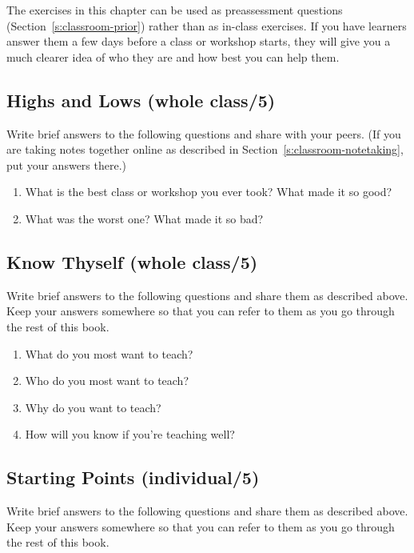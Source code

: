 The exercises in this chapter can be used as preassessment questions
(Section~\ref{s:classroom-prior}) rather than as in-class exercises. If
you have learners answer them a few days before a class or workshop
starts, they will give you a much clearer idea of who they are and how
best you can help them.

\subsection{Highs and Lows (whole class/5)}\label{highs-and-lows-whole-class5}

Write brief answers to the following questions and share with your
peers. (If you are taking notes together online as described in
Section~\ref{s:classroom-notetaking}, put your answers there.)

\begin{enumerate}
\item
  What is the best class or workshop you ever took? What made it so
  good?
\item
  What was the worst one? What made it so bad?
\end{enumerate}

\subsection{Know Thyself (whole class/5)}\label{know-thyself-whole-class5}

Write brief answers to the following questions and share them as
described above. Keep your answers somewhere so that you can refer to
them as you go through the rest of this book.

\begin{enumerate}
\item
  What do you most want to teach?
\item
  Who do you most want to teach?
\item
  Why do you want to teach?
\item
  How will you know if you're teaching well?
\end{enumerate}

\subsection{Starting Points (individual/5)}\label{starting-points-individual5}

Write brief answers to the following questions and share them as
described above. Keep your answers somewhere so that you can refer to
them as you go through the rest of this book.

